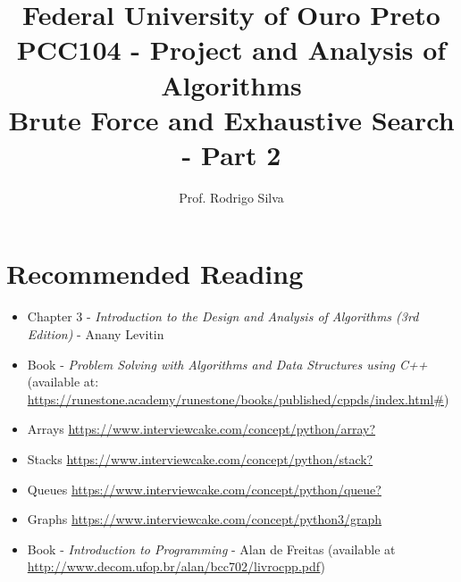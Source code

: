 \documentclass{article}
\title{\vspace{-2 cm}Federal University of Ouro Preto \\ PCC104 - Project and Analysis of Algorithms \\ Brute Force and Exhaustive Search - Part 2}
\author{Prof. Rodrigo Silva}
\begin{document}
\maketitle


\section{Recommended Reading}

\begin{itemize}
    \item Chapter 3 - \textit{Introduction to the Design and Analysis of Algorithms (3rd Edition)} - Anany Levitin 
    \item Book - \textit{Problem Solving with Algorithms and Data Structures using C++} (available at: \url{https://runestone.academy/runestone/books/published/cppds/index.html#})
    \item Arrays \url{https://www.interviewcake.com/concept/python/array?}
    \item Stacks \url{https://www.interviewcake.com/concept/python/stack?}
    \item Queues \url{https://www.interviewcake.com/concept/python/queue?}
    \item Graphs \url{https://www.interviewcake.com/concept/python3/graph}
    \item Book - \textit{Introduction to Programming} - Alan de Freitas (available at \url{http://www.decom.ufop.br/alan/bcc702/livrocpp.pdf})
\end{itemize}
\end{document}
